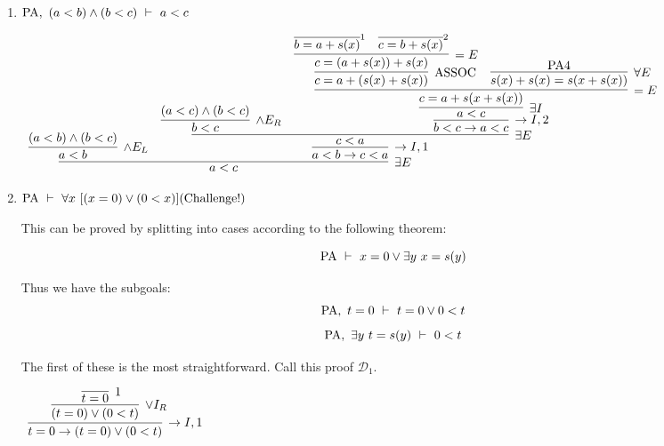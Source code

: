 \documentclass[11pt]{report}
\newcommand{\temp}[2]{{\overline{#2}}^{#1}}
\begin{document}
\begin{enumerate}
\begin{enumerate}
			\begin{center}
			\footnotesize{$\begin{array}{c}
				\infer[\exists E]{a < b}
					{s(a) < s(b)
					&
					\infer[\to I,1]{s(b) = s(a) + s(t) \to a < b}
						{\infer[\text{SUGAR}]{a < b}
							{\infer[\MP]{b = a + s(t)}
								{\infer[\forall E]{s(b) = s(a + s(t)) \to b = a + s(t)}
									{\PA 2}
								&
								\infer[=E]{s(b) = s(a + s(t))}
									{\infer[1]{s(b) = s(a) + s(t)}{}
									&
									\infer[\forall E]{s(a) + s(t) = s(a + s(t))}{\infer[\THM]{\forall x \ \forall y \ s(x) + y = s(x + y)}
										{}}}}}}}
			\end{array}$}
			\end{center}
			
			\newpage
			\item $\PA , \ (a < b) \land (b < c) \ \vdash \ a < c$
			{\scriptsize
			\begin{center}
				\scriptsize{$\begin{array}{c}
					\infer[\exists E]{a < c}
						{\infer[\land E_{L}]{a < b}
							{(a < b) \land (b < c)}
						&
						\infer[\to I,1]{a < b \to c < a}
							{\infer[\exists E]{c < a}
								{\infer[\land E_{R}]{b < c}{(a < c) \land (b < c)}
								&
								\infer[\to I,2]{b < c \to a < c}
									{\infer[\exists I]{a < c}
										{\infer[=E]{c = a + s(x + s(x))}
											{\infer[\text{ASSOC}]{c = a + (s(x) + s(x))}
												{\infer[=E]{c = (a + s(x)) + s(x)}
													{\temp{1}{b = a + s(x)}
													&
													\temp{2}{c = b + s(x)}}}
											&
											\infer[\forall E]{s(x) + s(x) = s(x + s(x))}{\PA 4}}}}}}}
				
				\end{array}$}			
			\end{center}}
			
			\item $\PA \ \vdash \ \forall x \ [(x = 0) \lor (0 < x)] \hfill \text{(Challenge!)}$
			
			This can be proved by splitting into cases according to the following theorem:
			
			$$\text{PA} \ \vdash \ x = 0 \lor \exists y \ x = s(y)$$
			
			Thus we have the subgoals: 			
			$$\text{PA}, \ t = 0 \ \vdash \ t = 0 \lor 0 < t$$
			$$\text{PA}, \ \exists y \ t = s(y) \ \vdash \ 0 < t$$
			
			The first of these is the most straightforward. Call this proof $\mathcal{D}_{1}$.
			
			\begin{center}
				$\begin{array}{c}
					\infer[\to I, 1]{t = 0 \to (t = 0) \lor (0 < t)}
						{\infer[\lor I_{R}]{(t = 0) \lor (0 < t)}
							{\infer[1]{t = 0}
								{}}}
				\end{array}$
			\end{center}
			

\end{enumerate}
\end{enumerate}
\end{document}
